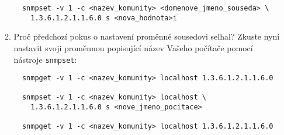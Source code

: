 \begin{itemize}
\begin{enumerate}
\begin{verbatim}
  snmpset -v 1 -c <nazev_komunity> <domenove_jmeno_souseda> \
    1.3.6.1.2.1.1.6.0 s <nova_hodnota>i
\end{verbatim}
          \item Proč předchozí pokus o nastavení proměnné sousedovi selhal? Zkuste nyní
          nastavit svoji proměnnou popisující název Vašeho počítače
          pomocí nástroje {\tt snmpset}:
\begin{verbatim}
  snmpget -v 1 -c <nazev_komunity> localhost 1.3.6.1.2.1.1.6.0

  snmpset -v 1 -c <nazev_komunity> localhost \
    1.3.6.1.2.1.1.6.0 s <nove_jmeno_pocitace>

  snmpget -v 1 -c <nazev_komunity> localhost 1.3.6.1.2.1.1.6.0
\end{verbatim}

\end{enumerate}
\end{itemize}

